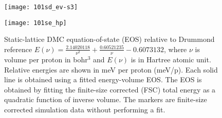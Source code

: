 \begin{figure}[h]
\begin{minipage}{0.48\textwidth}
\texttt{[image: 101sd\_ev-s3]}
\end{minipage}
\begin{minipage}{0.48\textwidth}
\texttt{[image: 101se\_hp]}
\end{minipage}
\caption{Static-lattice DMC equation-of-state (EOS) relative to Drummond reference $E(\nu) = \frac{2.14020118}{\nu^2} + \frac{0.60521235}{\nu} - 0.6073132$, where $\nu$ is volume per proton in bohr$^3$ and $E(\nu)$ is in Hartree atomic unit. Relative energies are shown in meV per proton (meV/p). Each solid line is obtained using a fitted energy-volume EOS. The EOS is obtained by fitting the finite-size corrected (FSC) total energy as a quadratic function of inverse volume. The markers are finite-size corrected simulation data without performing a fit. \label{fig:static-qmc-vs-drummond}}
\end{figure}

\begin{comment}
Finally, we divide each orbital by an electron-ion Jastrow constructed on the reciprocal lattice vectors of the simulation cell $\bs{G}_s$
\begin{align}
J_{ei}(\bs{r}; \bs{R}) = \exp\left\{ -\frac{1}{2\Omega} \sum\limits_{\bs{k}\neq\bs{0}}^{\bs{k}\in\bs{G}_s}
U_{\bs{k}}^{ei} 
\left(\frac{1}{N}\sum\limits_{j=1}^{N_e} e^{i\bs{k}\cdot\bs{r}_j} \right)
\left(\frac{1}{N}\sum\limits_{J=1}^{N_p} e^{-i\bs{k}\cdot\bs{R}_J}  \right)
\right\},\label{eq:rpa-ep-jas}
\end{align}
\begin{align}
J_{ei}(\bs{r}_j; \bs{R}) =& \exp\left\{ \text{iFFT}\left[ 
U_{\bs{k}}^{ep}  \left(\sum\limits_{J=1}^{N_p} \frac{e^{-i\bs{k}\cdot\bs{R}_J}}{N_p}  \right)
\right] \right\}\\
=& \exp\left\{ 
-\frac{(2\pi)^3}{\Omega N_k} \sum\limits_{\bs{k}\neq\bs{0}}^{\bs{k}\in\bs{G}_s} e^{i\bs{k}\cdot\bs{r}_j}~
U_{\bs{k}}^{ep} 
\left(\sum\limits_{J=1}^{N_p} \frac{e^{-i\bs{k}\cdot\bs{R}_J}}{N_p}  \right)
\right\},\label{eq:rpa-ep-jas}
\end{align}
where $\Omega$ is the simulation cell volume. $\bs{r}$ contain all electronic coordinates, $\bs{R}$ contain all ionic coordinates. $N_e$ is the number of electrons, while $N_p$ is the number of protons.
The Jastrow potential $U_{\bs{k}}^{ei}$ in eq.~(\ref{eq:rpa-ep-jas}) is chosen to be the RPA form written by Ceperley and Alder
\begin{align}
2U^{ei}_k = -a_k(1+a_k)^{-1/2},
\end{align}
where $a_k=\frac{12}{r_s^3k^4}$ in Hartree atomic units.
\end{comment}